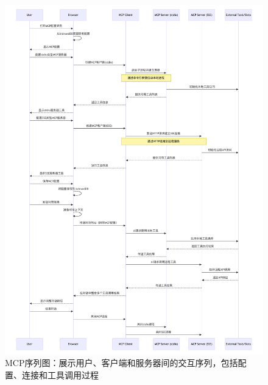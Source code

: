 \begin{figure}[htbp]
  \centering
  \includegraphics[width=\textwidth]{figures/mcp_sequence.pdf}
  \caption{MCP序列图：展示用户、客户端和服务器间的交互序列，包括配置、连接和工具调用过程}
  \label{fig:mcp_sequence}
\end{figure}


    
    

